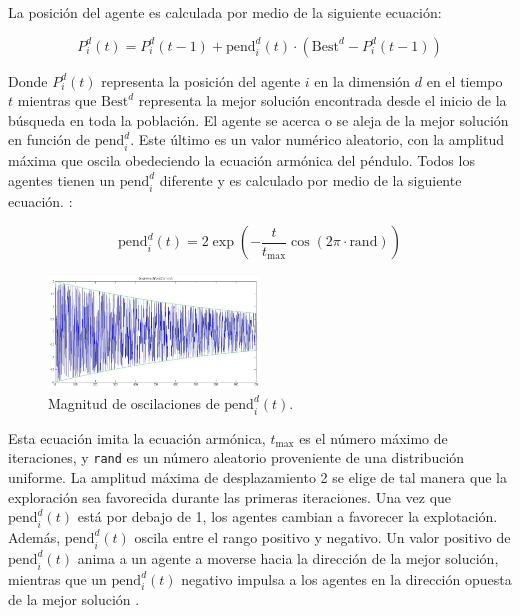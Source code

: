 \documentclass[conference]{IEEEtran}
\begin{document}
La posición del agente es calculada por medio de la siguiente
ecuación\cite{aziz2022}:

\begin{equation}
    P_i^d (t) = P_i^d (t-1) + \text{pend}_i^d (t) \cdot (\text{Best}^d - P_i^d
    (t-1))
\end{equation}

Donde $P_i^d (t)$ representa la posición del agente $i$ en la dimensión $d$ en
el tiempo $t$ mientras que $\text{Best}^d$ representa la mejor solución
encontrada desde el inicio de la búsqueda en toda la población. El agente se
acerca o se aleja de la mejor solución en función de $\text{pend}_i^d$. Este
último es un valor numérico aleatorio, con la amplitud máxima que oscila
obedeciendo la ecuación armónica del péndulo. Todos los agentes tienen un
$\text{pend}_i^d$ diferente y es calculado por medio de la siguiente ecuación.
\cite{aziz2022}:

\begin{equation}
    \text{pend}_i^d (t) = 2 \exp\left(-\frac{t}{t_{\text{max}}}\cos(2\pi \cdot
    \text{rand})\right)
\end{equation}

\begin{figure}[h!]
    \centering
    \includegraphics[width=0.5\textwidth, keepaspectratio]{Figures/image2.png}
    \caption{Magnitud de oscilaciones de $\text{pend}_i^d (t)$.
        \cite{aziz2022}}
    \label{fig:mi_etiqueta}
\end{figure}

Esta ecuación imita la ecuación armónica, $t_{\text{max}}$ es el número máximo
de
iteraciones, y \texttt{rand} es un número aleatorio proveniente de una
distribución uniforme. La amplitud máxima de desplazamiento 2 se elige de tal
manera que la exploración sea favorecida durante las primeras iteraciones. Una
vez que $\text{pend}_i^d (t)$ está por debajo de 1, los agentes cambian a
favorecer la explotación. Además, $\text{pend}_i^d (t)$ oscila entre el rango
positivo y negativo. Un valor positivo de $\text{pend}_i^d (t)$ anima a un
agente a moverse hacia la dirección de la mejor solución, mientras que un
$\text{pend}_i^d (t)$ negativo impulsa a los agentes en la dirección opuesta de
la mejor solución \cite{aziz2022}.
\end{document}
